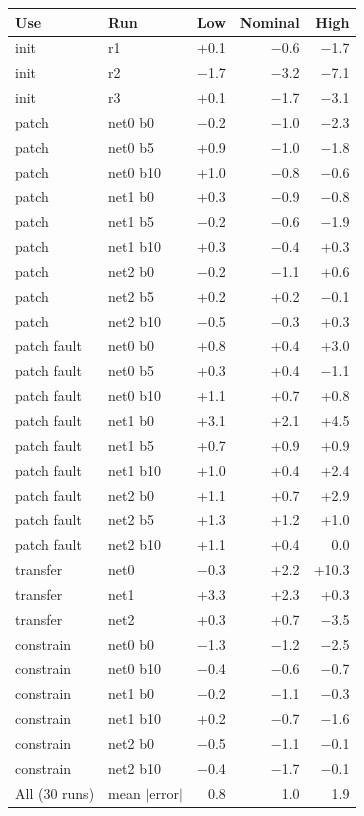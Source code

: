 \begin{tabular}{llrrr}
\toprule
Use & Run & Low & Nominal & High \\
\midrule
init & r1 & +0.1 & $-$0.6 & $-$1.7 \\
init & r2 & $-$1.7 & $-$3.2 & $-$7.1 \\
init & r3 & +0.1 & $-$1.7 & $-$3.1 \\
patch & net0 b0 & $-$0.2 & $-$1.0 & $-$2.3 \\
patch & net0 b5 & +0.9 & $-$1.0 & $-$1.8 \\
patch & net0 b10 & +1.0 & $-$0.8 & $-$0.6 \\
patch & net1 b0 & +0.3 & $-$0.9 & $-$0.8 \\
patch & net1 b5 & $-$0.2 & $-$0.6 & $-$1.9 \\
patch & net1 b10 & +0.3 & $-$0.4 & +0.3 \\
patch & net2 b0 & $-$0.2 & $-$1.1 & +0.6 \\
patch & net2 b5 & +0.2 & +0.2 & $-$0.1 \\
patch & net2 b10 & $-$0.5 & $-$0.3 & +0.3 \\
patch fault & net0 b0 & +0.8 & +0.4 & +3.0 \\
patch fault & net0 b5 & +0.3 & +0.4 & $-$1.1 \\
patch fault & net0 b10 & +1.1 & +0.7 & +0.8 \\
patch fault & net1 b0 & +3.1 & +2.1 & +4.5 \\
patch fault & net1 b5 & +0.7 & +0.9 & +0.9 \\
patch fault & net1 b10 & +1.0 & +0.4 & +2.4 \\
patch fault & net2 b0 & +1.1 & +0.7 & +2.9 \\
patch fault & net2 b5 & +1.3 & +1.2 & +1.0 \\
patch fault & net2 b10 & +1.1 & +0.4 & 0.0 \\
transfer & net0 & $-$0.3 & +2.2 & +10.3 \\
transfer & net1 & +3.3 & +2.3 & +0.3 \\
transfer & net2 & +0.3 & +0.7 & $-$3.5 \\
constrain & net0 b0 & $-$1.3 & $-$1.2 & $-$2.5 \\
constrain & net0 b10 & $-$0.4 & $-$0.6 & $-$0.7 \\
constrain & net1 b0 & $-$0.2 & $-$1.1 & $-$0.3 \\
constrain & net1 b10 & +0.2 & $-$0.7 & $-$1.6 \\
constrain & net2 b0 & $-$0.5 & $-$1.1 & $-$0.1 \\
constrain & net2 b10 & $-$0.4 & $-$1.7 & $-$0.1 \\
\midrule
All (30 runs) & mean $|$error$|$ & 0.8 & 1.0 & 1.9 \\
\bottomrule
\end{tabular}

